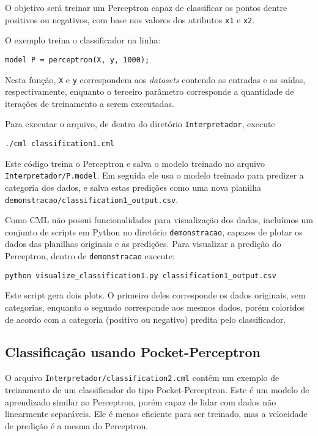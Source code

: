 \documentclass[12pt]{article}
\begin{document}
O objetivo será treinar um Perceptron capaz de classificar os pontos dentre positivos ou negativos, com base nos valores dos atributos \texttt{x1} e \texttt{x2}.

O exemplo treina o classificador na linha:

\begin{verbatim}
model P = perceptron(X, y, 1000);
\end{verbatim}

Nesta função, \texttt{X} e \texttt{y} correspondem aos \textit{datasets} contendo as entradas e as saídas, respectivamente, enquanto o terceiro parâmetro corresponde a quantidade de iterações de treinamento a serem executadas.

Para executar o arquivo, de dentro do diretório \texttt{Interpretador}, execute

\begin{verbatim}
./cml classification1.cml
\end{verbatim}

Este código treina o Perceptron e salva o modelo treinado no arquivo \texttt{Interpretador/P.model}. Em seguida ele usa o modelo treinado para predizer a categoria dos dados, e salva estas predições como uma nova planilha \texttt{demonstracao/classification1\_output.csv}.

Como CML não possui funcionalidades para visualização dos dados, incluímos um conjunto de scripts em Python no diretório \texttt{demonstracao}, capazes de plotar os dados das planilhas originais e as predições. Para visualizar a predição do Perceptron, dentro de \texttt{demonstracao} execute:

\begin{verbatim}
python visualize_classification1.py classification1_output.csv
\end{verbatim}

Este script gera dois plots. O primeiro deles corresponde os dados originais, sem categorias, enquanto o segundo corresponde aos mesmos dados, porém coloridos de acordo com a categoria (positivo ou negativo) predita pelo classificador.

\subsection{Classificação usando Pocket-Perceptron}

O arquivo \texttt{Interpretador/classification2.cml} contém um exemplo de treinamento de um classificador do tipo Pocket-Perceptron. Este é um modelo de aprendizado similar ao Perceptron, porém capaz de lidar com dados não linearmente separáveis. Ele é menos eficiente para ser treinado, mas a velocidade de predição é a mesma do Perceptron.
\end{document}
